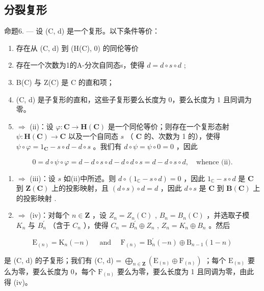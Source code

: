 \subsection{分裂复形}

命题6. — 设 (C, d) 是一个复形。以下条件等价：

\begin{enumerate}
\def\labelenumi{(\roman{enumi})}
\item
  存在从 (C, d) 到 (H(C), 0) 的同伦等价
\item
  存在一个次数为1的A-分次自同态s，使得 \(d = d \circ s \circ d\) ;
\item
  B(C) 与 Z(C) 是 C 的直和项；
\item
  (C, d) 是子复形的直和，这些子复形要么长度为 0，要么长度为 1 且同调为零。
\item
  \(\Rightarrow\) (ii)：设 \(\varphi: \mathbf{C} \to \mathbf{H}(\mathbf{C})\) 是一个同伦等价；则存在一个复形态射 \(\psi: \mathbf{H}(\mathbf{C}) \to \mathbf{C}\) 以及一个自同态 \(s\) （ \(\mathbf{C}\) 的、次数为 1 的），使得 \(\psi \circ \varphi = 1_{\mathbf{C}} - s \circ d - d \circ s\) 。我们有 \(d \circ \psi = \psi \circ 0 = 0\) ，因此
\end{enumerate}

\[
0 = d \circ \psi \circ \varphi = d - d \circ s \circ d - d \circ d \circ s = d - d \circ s \circ d, \quad \text {whence (ii)}.
\]

\begin{enumerate}
\def\labelenumi{(\roman{enumi})}
\setcounter{enumi}{1}
\item
  \(\Rightarrow\) (iii)：设 \(s\) 如(ii)中所述。则 \(d \circ (1_{\mathbb{C}} - s \circ d) = 0\) ，因此 \(1_{\mathbb{C}} - s \circ d\) 是 \(\mathbf{C}\) 到 \(\mathbf{Z}(\mathbf{C})\) 上的投影映射，且 \((d \circ s) \circ d = d\) ，因此 \(d \circ s\) 是 \(\mathbf{C}\) 到 \(\mathbf{B}(\mathbf{C})\) 上的投影映射 .
\item
  \(\Rightarrow\) (iv)：对每个 \(n\in\mathbf{Z}\) ，设 \(Z_{n}=Z_{n}(\mathrm{C})\) , \(B_{n}=B_{n}(\mathrm{C})\) ，并选取子模 \(K_{n}\) 与 \(B_{n}^{\prime}\) （含于 \(C_{n}\) ），使得 \(C_{n}=B_{n}^{\prime}\oplus Z_{n}\) , \(Z_{n}=K_{n}\oplus B_{n}\) 。然后
\end{enumerate}

\[
\mathrm{E} _ {(n)} = \mathrm{K} _ {n} (- n) \quad \text { and } \quad \mathrm{F} _ {(n)} = \mathrm{B} _ {n} ^ {\prime} (- n) \oplus \mathrm{B} _ {n - 1} (1 - n)
\]

是 (C, d) 的子复形；我们有 (C, d) = \(\bigoplus_{n \in \mathbf{Z}} (\mathrm{E}_{(n)} \oplus \mathrm{F}_{(n)})\) ；每个 \(\mathrm{E}_{(n)}\) 要么为零，要么长度为 0，每个 \(\mathrm{F}_{(n)}\) 要么为零，要么长度为 1 且同调为零，由此得 (iv)。

